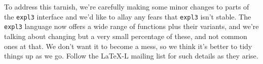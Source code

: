 \documentclass{ltnews}
\begin{document}
To address this tarnish, we're carefully making some minor changes to parts of the \texttt{expl3} interface and we'd like to allay any fears that \texttt{expl3} isn't stable.
The \texttt{expl3} language now offers a wide range of functions plus their variants, and we're talking about changing but a very small percentage of these, and not common ones at that.
We don't want it to become a mess, so we think it's better to tidy things up as we go.
Follow the LaTeX-L mailing list for such details as they arise.
\end{document}
